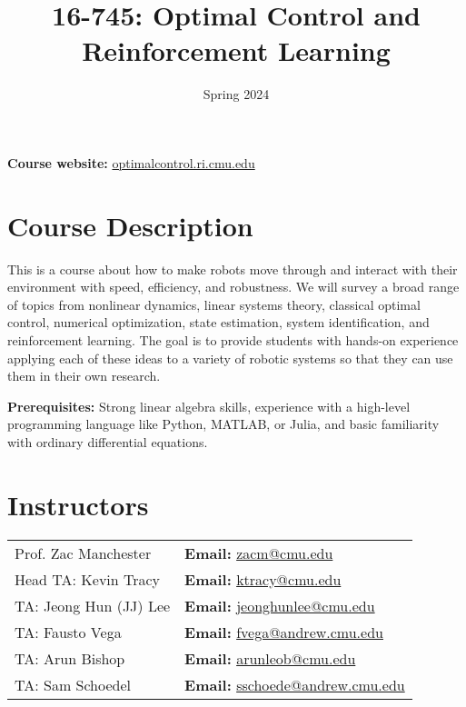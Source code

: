 \documentclass[11pt,letterpaper]{article}
\title{16-745: Optimal Control and Reinforcement Learning}
\author{Spring 2024}
\date{}
\begin{document}
\maketitle

\noindent 
\textbf{Course website:} \href{https://optimalcontrol.ri.cmu.edu/}{optimalcontrol.ri.cmu.edu}

\section*{Course Description}

This is a course about how to make robots move through and interact with their environment with speed, efficiency, and robustness. We will survey a broad range of topics from nonlinear dynamics, linear systems theory, classical optimal control, numerical optimization, state estimation, system identification, and reinforcement learning. The goal is to provide students with hands-on experience applying each of these ideas to a variety of robotic systems so that they can use them in their own research.



\medskip
\noindent
\textbf{Prerequisites:} Strong linear algebra skills, experience with a high-level programming language like Python, MATLAB, or Julia, and basic familiarity with ordinary differential equations.

\section*{Instructors}

\begin{center}
\begin{tabular}{l l}
	Prof. Zac Manchester & \textbf{Email:} \href{mailto:zacm@cmu.edu}{zacm@cmu.edu} \\
	Head TA: Kevin Tracy & \textbf{Email:} \href{mailto:ktracy@cmu.edu}{ktracy@cmu.edu}
	\\
	TA: Jeong Hun (JJ) Lee & \textbf{Email:} \href{mailto:jeonghunlee@cmu.edu}{jeonghunlee@cmu.edu}
	\\
	TA: Fausto Vega & \textbf{Email:} \href{fvega@andrew.cmu.edu}{fvega@andrew.cmu.edu}
	\\
 TA: Arun Bishop & \textbf{Email:} \href{arunleob@cmu.edu}{arunleob@cmu.edu}
 \\
	TA: Sam Schoedel & \textbf{Email:} \href{sschoede@andrew.cmu.edu}{sschoede@andrew.cmu.edu}
\end{tabular}
\end{center}
\end{document}
